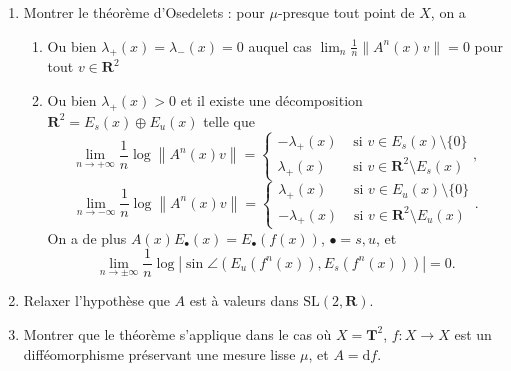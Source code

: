 \documentclass[a4paper,10pt,openany]{article}
\theoremstyle{plain}
\theoremstyle{definition}
\newcommand{\dd}{\mathrm{d}}
\newcommand{\T}{\mathbf{T}}
\newcommand{\R}{\mathbf{R}}
\begin{document}
\begin{enumerate}[resume]
\item Montrer le th\'eor\`eme d'Osedelets : pour $\mu$-presque tout point de $X$, on a
\begin{enumerate}[label=(\roman*)]
\item Ou bien $\lambda_+(x) = \lambda_-(x) = 0$ auquel cas $\lim_n \frac{1}{n} \|A^n(x)v\| = 0$ pour tout $v \in \R^2$
\item Ou bien $\lambda_+(x) > 0$ et il existe une d\'ecomposition $\R^2 = E_s(x) \oplus E_u(x)$ telle que
$$
\lim _{n \rightarrow+\infty} \frac{1}{n} \log \left\|A^{n}(x) v\right\|=\left\{\begin{array}{ll}{-\lambda_{+}(x)} & {\text { si } v \in E_s(x) \setminus\{0\}} \\ {\lambda_{+}(x)} & {\text { si } v \in \R^{2} \setminus E_s(x)}\end{array}\right.,
$$
$$
\lim _{n \rightarrow-\infty} \frac{1}{n} \log \left\|A^{n}(x) v\right\|=\left\{\begin{array}{ll}{\lambda_{+}(x)} & {\text { si } v \in E_u(x) \setminus\{0\}} \\ {-\lambda_{+}(x)} & {\text { si } v \in \R^{2} \setminus E_u(x)}\end{array}\right..
$$
On a de plus $A(x)E_\bullet(x) = E_\bullet(f(x))$, $\bullet = s,u$, et 
$$
\lim _{n \rightarrow \pm \infty} \frac{1}{n} \log \left|\sin \angle\left(E_{u}(f^n(x)), E_s(f^n(x))\right)\right|=0.
$$
\end{enumerate}
\item Relaxer l'hypoth\`ese que $A$ est \`a valeurs dans $\mathrm{SL}(2, \R)$.
\item Montrer que le th\'eor\`eme s'applique dans le cas o\`u $X = \T^2$, $f : X \to X$ est un diff\'eomorphisme pr\'eservant une mesure lisse $\mu$, et $A = \dd f$. 
\end{enumerate}
\end{document}
